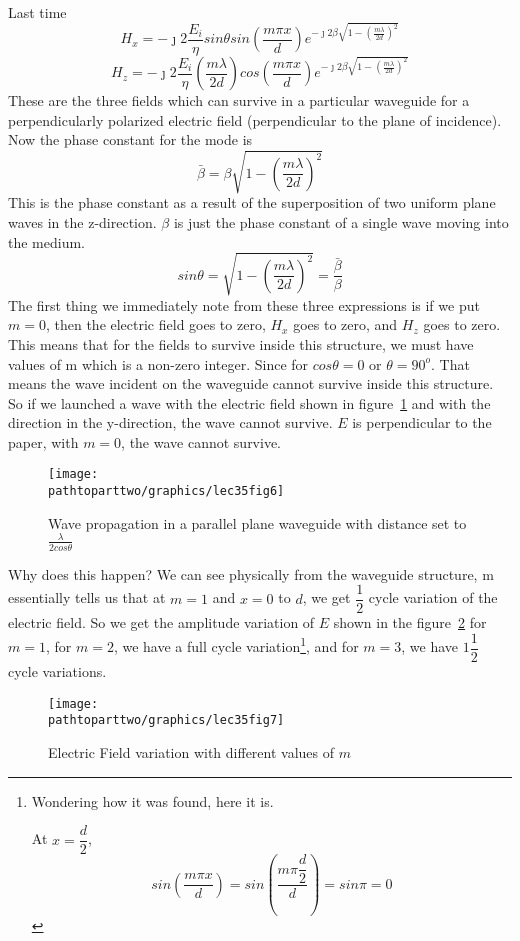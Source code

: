 Last time
\begin{dmath}
H_x = -\jmath 2\frac{E_i}{\eta}sin\theta sin\left(\frac{m\pi x}{d}\right)e^{-\jmath 2\beta\sqrt{1 - \left(\frac{m\lambda}{2d}\right)^2}}
\end{dmath}
\begin{dmath}
H_z = -\jmath 2\frac{E_i}{\eta}\left(\frac{m\lambda}{2d}\right)cos\left(\frac{m\pi x}{d}\right)e^{-\jmath 2\beta\sqrt{1 - \left(\frac{m\lambda}{2d}\right)^2}}
\end{dmath}
These are the three fields which can survive in a particular waveguide for a perpendicularly polarized electric field (perpendicular to the plane of incidence). Now the phase constant for the mode is
\begin{dmath}
\bar{\beta} = \beta\sqrt{1 - \left(\frac{m\lambda}{2d}\right)^2}
\label{eqn:phaseconst}
\end{dmath}
This is the phase constant as a result of the superposition of two uniform plane waves in the z-direction. $\beta$ is just the phase constant of a single wave moving into the medium.
\begin{dmath}
sin\theta = \sqrt{1-\left(\frac{m\lambda}{2d}\right)^2} 
=\frac{\bar{\beta}}{\beta}
\end{dmath}
The first thing we immediately note from these three expressions is if we put $m=0$, then the electric field goes to zero, $H_x$ goes to zero, and $H_z$ goes to zero. This means that for the fields to survive inside this structure, we must have values of m which is a non-zero integer. Since for $cos\theta = 0$ or $\theta = 90^o$. That means the wave incident on the waveguide cannot survive inside this structure. So if we launched a wave with the electric field shown in figure~\ref{fig:lec35fig6} and with the direction in the y-direction, the wave cannot survive. $E$ is perpendicular to the paper, with $m=0$, the wave cannot survive. 
\begin{figure}[h]
\centering
\texttt{[image: \\pathtoparttwo/graphics/lec35fig6]}
\caption{Wave propagation in a parallel plane waveguide with distance set to $\frac{\lambda}{2cos\theta}$}
\label{fig:lec35fig6}
\end{figure}
Why does this happen? We can see physically from the waveguide structure, m essentially tells us that at $m=1$ and $x=0$ to $d$, we get $\dfrac{1}{2}$ cycle variation of the electric field. So we get the amplitude variation of $E$ shown in the figure~\ref{fig:lec35fig7} for $m=1$, for $m=2$, we have a full cycle variation\footnote{Wondering how it was found, here it is.

At $x=\dfrac{d}{2}$,
\begin{dmath*}
sin\left(\frac{m\pi x}{d}\right) = sin\left(\frac{m\pi \dfrac{d}{2}}{d}\right) = sin\pi = 0
\end{dmath*}}, and for $m=3$, we have $1\dfrac{1}{2}$ cycle variations. 
\begin{figure}[h]
\centering
\texttt{[image: \\pathtoparttwo/graphics/lec35fig7]}
\caption{Electric Field variation with different values of $m$}
\label{fig:lec35fig7}
\end{figure}

